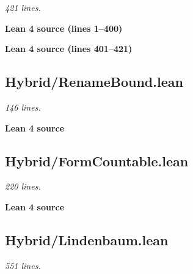 \documentclass[11pt,a4paper]{article}
\renewcommand{\_}{\origtextunderscore\allowbreak}
\begin{document}
\emph{421 lines.}

\noindent\textcolor{green!40!black}{\textbf{Lean 4 source (lines 1--400)}}\par\vspace{0.25\baselineskip}


\noindent\textcolor{green!40!black}{\textbf{Lean 4 source (lines 401--421)}}\par\vspace{0.25\baselineskip}


\hypertarget{hybridrenamebound.lean}{%
\subsection{Hybrid/RenameBound.lean}\label{hybridrenamebound.lean}}

\emph{146 lines.}

\vspace{0.5\baselineskip}
\noindent\textcolor{green!40!black}{\textbf{Lean 4 source}}\par\vspace{0.25\baselineskip}

\vspace{0.5\baselineskip}

\hypertarget{hybridformcountable.lean}{%
\subsection{Hybrid/FormCountable.lean}\label{hybridformcountable.lean}}

\emph{220 lines.}

\vspace{0.5\baselineskip}
\noindent\textcolor{green!40!black}{\textbf{Lean 4 source}}\par\vspace{0.25\baselineskip}

\vspace{0.5\baselineskip}

\hypertarget{hybridlindenbaum.lean}{%
\subsection{Hybrid/Lindenbaum.lean}\label{hybridlindenbaum.lean}}

\emph{551 lines.}
\end{document}
